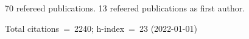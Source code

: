 70 refereed publications. 13 refeered publications as first author.

Total citations~=~2240; h-index~=~23 (2022-01-01)